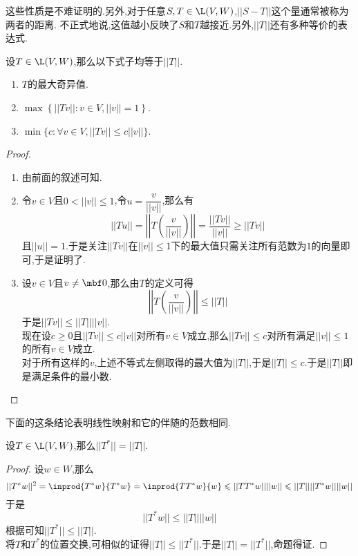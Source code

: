 \documentclass{ctexart}
\begin{document}
这些性质是不难证明的.另外,对于任意$S,T\in\L(V,W)$,$||S-T||$这个量通常被称为两者的距离.%
不正式地说,这值越小反映了$S$和$T$越接近.另外,$||T||$还有多种等价的表达式.
\begin{formal}[1.4 $||T||$的多种表达式]
    设$T\in\L(V,W)$,那么以下式子均等于$||T||$.
    \begin{enumerate}[label=\tbf{(\alph*)}]
        \item $T$的最大奇异值.
        \item $\max\left\{||Tv||:v\in V,||v||=1\right\}$.
        \item $\min\{c:\forall v\in V,||Tv||\leqslant c||v||\}$.
    \end{enumerate}
\end{formal}
\begin{proof}
    \begin{enumerate}[label=\tbf{(\alph*)}]
        \item 由前面的叙述可知.
        \item 令$v\in V$且$0<||v||\leqslant 1$,令$u=\dfrac{v}{||v||}$,那么有
            \[||Tu||=\left|\left|T\left(\dfrac{v}{||v||}\right)\right|\right|=\dfrac{||Tv||}{||v||}\geqslant||Tv||\]
            且$||u||=1$.于是关注$||Tv||$在$||v||\leqslant1$下的最大值只需关注所有范数为$1$的向量即可,于是证明了.
        \item 设$v\in V$且$v\neq\mbf0$,那么由$T$的定义可得
            \[\left|\left|T\left(\dfrac{v}{||v||}\right)\right|\right|\leqslant||T||\]
            于是$||Tv||\leqslant||T||||v||$.\\
            现在设$c\geqslant0$且$||Tv||\leqslant c||v||$对所有$v\in V$成立,那么$||Tv||\leqslant c$对所有满足$||v||\leqslant 1$的所有$v\in V$成立.\\
            对于所有这样的$v$,上述不等式左侧取得的最大值为$||T||$,于是$||T||\leqslant c$.于是$||T||$即是满足条件的最小数.
    \end{enumerate}
\end{proof}\noindent
下面的这条结论表明线性映射和它的伴随的范数相同.
\begin{formal}[1.5 伴随的范数]
    设$T\in\L(V,W)$,那么$||T^*||=||T||$.
\end{formal}
\begin{proof}
    设$w\in W$,那么
    \[||T^*w||^2=\inprod{T^*w}{T^*w}=\inprod{TT^*w}{w}\leqslant||TT^*w||||w||\leqslant||T||||T^*w||||w||\]
    于是
    \[||T^*w||\leqslant||T||||w||\]
    根据可知$||T^*||\leqslant||T||$.\\
    将$T$和$T^*$的位置交换,可相似的证得$||T||\leqslant||T^*||$.于是$||T||=||T^*||$,命题得证.
\end{proof}\noindent
\end{document}
